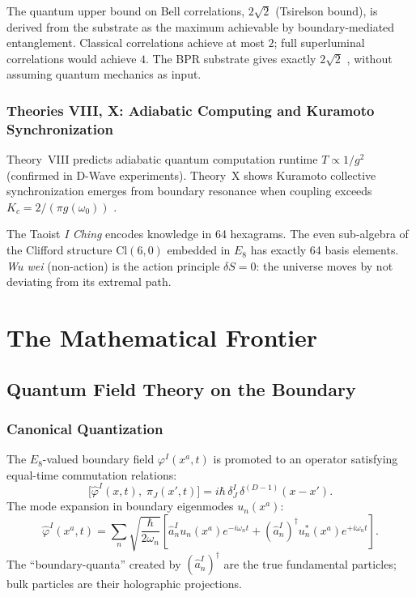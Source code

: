 \documentclass[12pt,oneside]{book}
\theoremstyle{definition}
\newcommand{\EEight}{E_8}
\begin{document}
The quantum upper bound on Bell correlations, $2\sqrt{2}$ (Tsirelson bound),
is derived from the substrate as the maximum achievable by boundary-mediated
entanglement. Classical correlations achieve at most $2$; full superluminal
correlations would achieve $4$. The BPR substrate gives exactly $2\sqrt{2}$
\citep{Hensen2015}, without assuming quantum mechanics as input.

\section{Theories VIII, X: Adiabatic Computing and Kuramoto Synchronization}

Theory~VIII predicts adiabatic quantum computation runtime $T \propto 1/g^2$
(confirmed in D-Wave experiments). Theory~X shows Kuramoto collective synchronization
emerges from boundary resonance when coupling exceeds $K_c = 2/(\pi g(\omega_0))$
\citep{Kiss2007}.

\begin{resonance}
The Taoist \textit{I Ching} encodes knowledge in 64 hexagrams. The even
sub-algebra of the Clifford structure $\mathrm{Cl}(6,0)$ embedded in $\EEight$ has
exactly 64 basis elements. \textit{Wu wei} (non-action) is the action principle
$\delta S = 0$: the universe moves by not deviating from its extremal path.
\end{resonance}

\part{The Mathematical Frontier}

\chapter{Quantum Field Theory on the Boundary}
\label{chap:qft}

\section{Canonical Quantization}

The $\EEight$-valued boundary field $\varphi^I(x^a, t)$ is promoted to an operator
satisfying equal-time commutation relations:
\begin{equation}
  \bigl[\hat{\varphi}^I(x,t),\;\hat{\pi}_J(x',t)\bigr]
  = i\hbar\,\delta^I_J\,\delta^{(D-1)}(x - x').
\end{equation}
The mode expansion in boundary eigenmodes $u_n(x^a)$:
\begin{equation}
  \hat{\varphi}^I(x^a, t)
  = \sum_n\sqrt{\frac{\hbar}{2\omega_n}}\left[
      \hat{a}^I_n u_n(x^a)e^{-i\omega_n t}
      + (\hat{a}^I_n)^\dagger u^*_n(x^a)e^{+i\omega_n t}
    \right].
\end{equation}
The ``boundary-quanta'' created by $(\hat{a}^I_n)^\dagger$ are the true fundamental
particles; bulk particles are their holographic projections.
\end{document}
